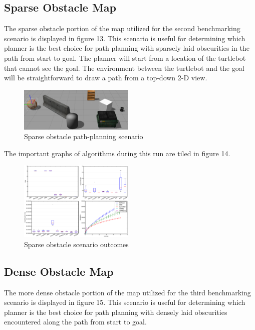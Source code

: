 \documentclass[conference]{IEEEtran} \usepackage[T1]{fontenc} \usepackage[backend=biber, style=ieee]{biblatex}
\begin{document}
\subsection{Sparse Obstacle Map} \label{Sparse Obstacle Map}

The sparse obstacle portion of the map utilized for the second benchmarking scenario is displayed in figure 13. This scenario is useful for determining which planner is 
the best choice for path planning with sparsely laid obscurities in the path from start to goal. The planner will start from a location of the turtlebot that cannot see
the goal. The environment between the turtlebot and the goal will be straightforward to draw a path from a top-down 2-D view.

\begin{figure}
\label{figure13} 
\centering 
\includegraphics[width=0.49\textwidth]{scenario_2}
\caption{Sparse obstacle path-planning scenario}
\end{figure}

The important graphs of algorithms during this run are tiled in figure 14. 

\begin{figure}
\label{figure14} 
\centering 
\includegraphics[width=0.49\textwidth]{s2_outcomes}
\caption{Sparse obstacle scenario outcomes}
\end{figure}

\subsection{Dense Obstacle Map} \label{Dense Obstacle Map}

The more dense obstacle portion of the map utilized for the third benchmarking scenario is displayed in figure 15. This scenario is useful for determining which planner is 
the best choice for path planning with densely laid obscurities encountered along the path from start to goal.
\end{document}
